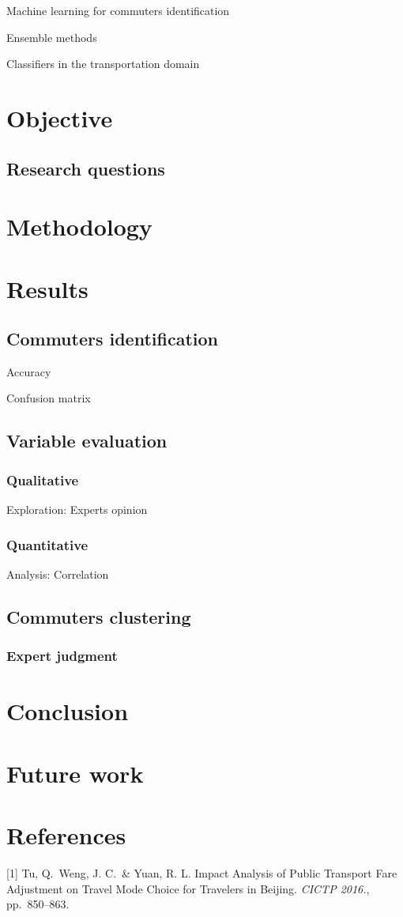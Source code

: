 \documentclass{article}
\begin{document}
Machine learning for commuters identification

Ensemble methods

Classifiers in the transportation domain

\section{Objective}
\subsection{Research questions}

\section{Methodology}

\section{Results}
\subsection{Commuters identification}
Accuracy

Confusion matrix

\subsection{Variable evaluation}
\subsubsection{Qualitative}
Exploration: Experts opinion

\subsubsection{Quantitative}
Analysis: Correlation

\subsection{Commuters clustering}
\subsubsection{Expert judgment}

\section{Conclusion}

\section{Future work}

\section*{References}

\small

[1] Tu, Q.\ Weng, J. C.\ \& Yuan, R. L. Impact Analysis of Public Transport Fare Adjustment on Travel Mode Choice for Travelers in Beijing. {\it CICTP 2016.}, pp.\ 850--863.
\end{document}
